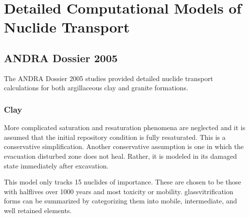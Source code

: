 \section{Detailed Computational Models of Nuclide Transport}
\label{sec:detailed_nuclide}

\subsection{ANDRA Dossier 2005} The ANDRA Dossier 2005 studies provided
detailed nuclide transport calculations for both argillaceous clay and granite
formations.

\subsubsection{Clay} More complicated saturation and resaturation phenomena are
neglected and it is assumed that the initial repository condition is fully
resaturated. This is a conservative simplification. Another conservative
assumption is one in which the evacuation disturbed zone does not heal. Rather,
it is modeled in its damaged state immediately after excavation. 

This model only tracks 15 nuclides of importance.  These are chosen to be those
with halflives over 1000 years and most toxicity or mobility.
\cite{andra_argile:_2005} %
glassvitrification forms can be summarized by categorizing them into mobile,
intermediate, and well retained elements. 








